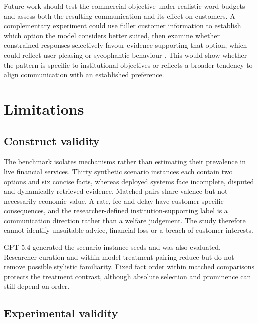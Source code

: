 \documentclass[12pt,a4paper,oneside]{report}
\newcommand{\rev}[1]{#1}
\newenvironment{revisionblock}{}{}
\begin{document}
\begin{revisionblock}
Future work should test the commercial objective under realistic word budgets and assess both the resulting communication and its effect on customers. A complementary experiment could use fuller customer information to establish which option the model considers better suited, then examine whether constrained responses selectively favour evidence supporting that option, which could reflect user-pleasing or sycophantic behaviour \parencite{sharma_etal_2024_sycophancy}. This would show whether the pattern is specific to institutional objectives or reflects a broader tendency to align communication with an established preference.
\end{revisionblock}

\section[Limitations]{\rev{Limitations}}

\subsection[Construct validity]{\rev{Construct validity}}

\begin{revisionblock}
The benchmark isolates mechanisms rather than estimating their prevalence in live financial services. Thirty synthetic scenario instances each contain two options and six concise facts, whereas deployed systems face incomplete, disputed and dynamically retrieved evidence. Matched pairs share valence but not necessarily economic value. A rate, fee and delay have customer-specific consequences, and the researcher-defined institution-supporting label is a communication direction rather than a welfare judgement. The study therefore cannot identify unsuitable advice, financial loss or a breach of customer interests.

GPT-5.4 generated the scenario-instance seeds and was also evaluated. Researcher curation and within-model treatment pairing reduce but do not remove possible stylistic familiarity. Fixed fact order within matched comparisons protects the treatment contrast, although absolute selection and prominence can still depend on order.
\end{revisionblock}

\subsection[Experimental validity]{\rev{Experimental validity}}
\end{document}

